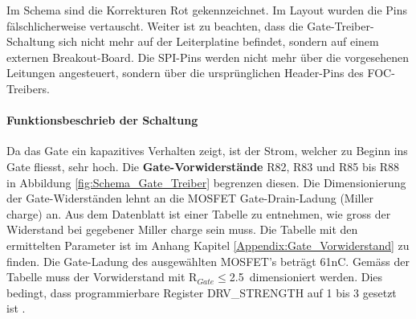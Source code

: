 Im Schema sind die Korrekturen Rot gekennzeichnet. Im Layout wurden die Pins fälschlicherweise vertauscht. Weiter ist zu beachten, dass die Gate-Treiber-Schaltung sich nicht mehr auf der Leiterplatine befindet, sondern auf einem externen Breakout-Board. Die SPI-Pins werden nicht mehr über die vorgesehenen Leitungen angesteuert, sondern über die ursprünglichen Header-Pins des FOC-Treibers.

\paragraph{Funktionsbeschrieb der Schaltung}\mbox{}

Da das Gate ein kapazitives Verhalten zeigt, ist der Strom, welcher zu Beginn ins Gate fliesst, sehr hoch. Die \textbf{Gate-Vorwiderstände} R82, R83 und R85 bis R88 in Abbildung \ref{fig:Schema_Gate_Treiber} begrenzen diesen.
Die Dimensionierung der Gate-Widerständen lehnt an die MOSFET Gate-Drain-Ladung (Miller charge) an. Aus dem Datenblatt ist einer Tabelle zu entnehmen, wie gross der Widerstand bei gegebener Miller charge sein muss. Die Tabelle mit den ermittelten Parameter ist im Anhang Kapitel \ref{Appendix:Gate_Vorwiderstand} zu finden. Die Gate-Ladung des ausgewählten MOSFET's beträgt 61nC. Gemäss der Tabelle muss der Vorwiderstand mit R$_{Gate}\leq$2.5\textOmega\ dimensioniert werden. Dies bedingt, dass programmierbare Register DRV\_STRENGTH auf 1 bis 3 gesetzt ist \cite[S.13]{trinamicmotion_control_gmbh__co_kg_tmc6200_2019}.



